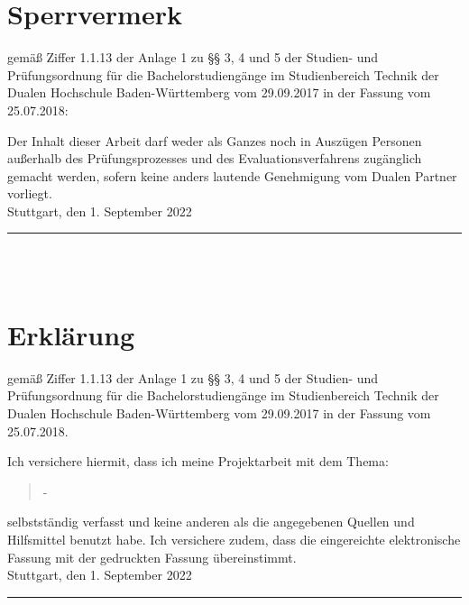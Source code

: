 \chapter*{Sperrvermerk} %
gemäß Ziffer 1.1.13 der Anlage 1 zu §§ 3, 4 und 5  der Studien- und Prüfungsordnung für die Bachelorstudiengänge im Studienbereich Technik der Dualen Hochschule Baden-Württemberg vom 29.09.2017 in der Fassung vom 25.07.2018:

Der Inhalt dieser Arbeit darf weder als Ganzes noch in Auszügen Personen außerhalb des Prüfungsprozesses und des Evaluationsverfahrens zugänglich gemacht werden, sofern keine anders lautende Genehmigung vom Dualen Partner vorliegt.\\[6ex]

Stuttgart, den 1. September 2022 \\[1ex]

\rule[-0.2cm]{5cm}{0.5pt} \\

\textsc{\autor} \\[10ex]

\chapter*{Erklärung} %

gemäß Ziffer 1.1.13 der Anlage 1 zu §§ 3, 4 und 5  der Studien- und Prüfungsordnung für die Bachelorstudiengänge im Studienbereich Technik der Dualen Hochschule Baden-Württemberg vom 29.09.2017 in der Fassung vom 25.07.2018.

Ich versichere hiermit, dass ich meine Projektarbeit mit dem Thema:

\begin{quote}
	\textit{\titel} -\textit{ \untertitel }
\end{quote}

selbstständig verfasst und keine anderen als die angegebenen Quellen und Hilfsmittel benutzt habe. Ich versichere zudem, dass die eingereichte elektronische Fassung mit der gedruckten Fassung übereinstimmt.\\[6ex]

Stuttgart, den 1. September 2022 \\[1ex]

\rule[-0.2cm]{5cm}{0.5pt} \\

\textsc{\autor} \\[10ex]

\rmfamily

\thispagestyle{empty}

\cleardoublepage

